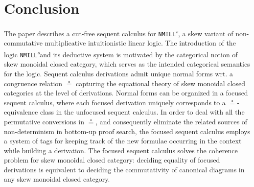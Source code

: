 \documentclass[submission,copyright,creativecommons]{eptcs}
\newtheorem{theorem}{Theorem}[section]
\theoremstyle{definition}
\newcommand{\RI}{\mathsf{RI}}
\newcommand{\NMILL}{\texttt{NMILL}}
\newcommand{\SkNMILL}{\NMILL\textsuperscript{\textit{s}}}
\begin{document}

\section{Conclusion}

The paper describes a cut-free sequent calculus for \SkNMILL, a skew variant of non-commutative multiplicative intuitionistic linear logic. The introduction of the logic \SkNMILL and its deductive system is motivated by the categorical notion of skew monoidal closed category, which serves as the intended categorical semantics for the logic. Sequent calculus derivations admit unique normal forms wrt. a congruence relation $\circeq$ capturing the equational theory of skew monoidal closed categories at the level of derivations. Normal forms can be organized in a focused sequent calculus, where each focused derivation uniquely corresponds to a $\circeq$-equivalence class in the unfocused sequent calculus. In order to deal with all the permutative conversions in $\circeq$, and consequently eliminate the related sources of non-determinism in bottom-up proof search, the focused sequent calculus employs a system of tags for keeping track of the new formulae occurring in the context while building a derivation. The focused sequent calculus solves the coherence problem for skew monoidal closed category: deciding equality of focused derivations is equivalent to deciding the commutativity of canonical diagrams in any skew monoidal closed category.
\end{document}
